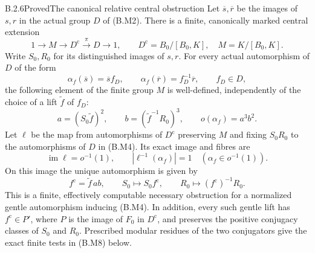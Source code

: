 \begin{result}{B.2.6}{Proved}{The canonical relative central obstruction}
Let $\overline s,\overline r$ be the images of $s,r$ in the actual
group $D$ of (B.M2).  There is a finite, canonically marked central
extension
\[
 1\longrightarrow M\longrightarrow D^{\mathrm c}
   \xrightarrow{\pi}D\longrightarrow1,
 \qquad
 D^{\mathrm c}=B_0/[B_0,K],\quad M=K/[B_0,K].    \tag{B.M3}
\]
Write $S_0,R_0$ for its distinguished images of $s,r$.
For every actual automorphism of $D$ of the form
\[
 \alpha_f(\overline s)=\overline s f_D,
 \qquad
 \alpha_f(\overline r)=f_D^{-1}\overline r,
 \qquad f_D\in D,                              \tag{B.M4}
\]
the following element of the finite group $M$ is well-defined,
independently of the choice of a lift $\widetilde f$ of $f_D$:
\[
 a=(S_0\widetilde f)^2,\qquad
 b=(\widetilde f^{-1}R_0)^3,\qquad
 o(\alpha_f)=a^3b^2.                           \tag{B.M5}
\]
Let $\ell$ be the map from automorphisms of $D^{\mathrm c}$
preserving $M$ and fixing $S_0R_0$ to the automorphisms of
$D$ in (B.M4).  Its exact image and fibres are
\[
              \operatorname{im}\ell=o^{-1}(1),
              \qquad |\ell^{-1}(\alpha_f)|=1
                  \quad(\alpha_f\in o^{-1}(1)).
\]
On this image the unique automorphism is given by
\[
 f^{\mathrm c}=\widetilde f\,ab,
 \qquad S_0\longmapsto S_0f^{\mathrm c},
 \qquad R_0\longmapsto(f^{\mathrm c})^{-1}R_0.   \tag{B.M6}
\]
This is a finite, effectively computable necessary obstruction
for a normalized gentle automorphism inducing (B.M4).
In addition, every such gentle lift has
$f^{\mathrm c}\in P'$, where $P$ is the image of $F_0$ in
$D^{\mathrm c}$, and preserves the positive conjugacy classes
of $S_0$ and $R_0$.  Prescribed modular residues of the two
conjugators give the exact finite tests in (B.M8) below.
\end{result}

